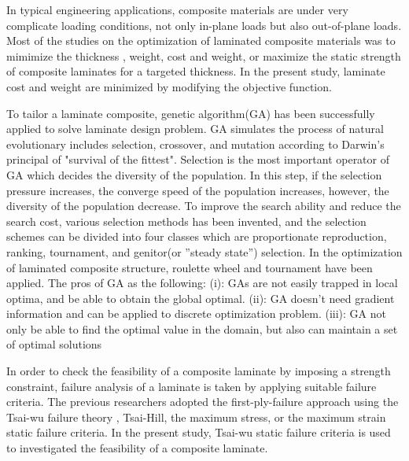 \documentclass[smallextended]{svjour3}       %
\begin{document}
In typical engineering applications, composite materials are under very
complicate loading conditions, not only in-plane loads but also out-of-plane
loads. Most of the studies on the optimization of laminated composite materials
was to mimimize the thickness \cite{abu1998optimum,walker2003technique},
weight\cite{fang1993design,deka2005multiobjective,park2008improved}, cost and
weight\cite{deka2005multiobjective,omkar2008artificial}, or maximize the static
strength of composite laminates for a targeted
thickness\cite{walker2003technique,lin2004stacking,kim2007development}. In the
present study, laminate cost and weight are minimized by modifying the objective function.

To tailor a laminate composite, genetic algorithm(GA) has been successfully
applied to solve laminate design
problem\cite{riche1993optimization,nagendra1996improved,sadagopan1998application,todoroki1998stacking,liu2000permutation,sivakumar1998optimum,walker2003technique,lin2004stacking,kang2005minimum,murugan2007target,akbulut2008optimum}.
GA simulates the process of natural evolutionary includes selection, crossover, 
and mutation according to Darwin's principal of "survival of the fittest".
Selection is the most important operator  of GA which decides the diversity of
the population.  In this step, if the selection pressure increases, the
converge speed of the population increases, however, the diversity of the
population decrease.  To improve the search ability and reduce the search cost,
various selection methods has been invented, and the selection schemes can be
divided into four classes which are proportionate reproduction, ranking,
tournament, and genitor(or ”steady state”) selection. In the optimization of
laminated composite structure, roulette wheel\cite{riche1993optimization,seresta2007optimal} and
tournament\cite{lin2004stacking} have been applied.
The pros of GA as the following: (i): GAs are not easily trapped in local
optima, and be able to obtain the global optimal. (ii): GA doesn't need
gradient information and can be applied to discrete optimization problem.
(iii): GA not only be able to find the optimal value in the domain, but also
can maintain a set of optimal solutions


In order to check the feasibility of a composite laminate by imposing a
strength constraint, failure analysis of a laminate is taken by applying
suitable failure criteria. The previous researchers adopted the
first-ply-failure approach using the Tsai-wu failure theory
\cite{massard1984computer,reddy1987first,fang1993design,soeiro1994multilevel,pelletier2006multi,jadhav2007parametric,omkar2008artificial,choudhury2019failure},
Tsai-Hill\cite{martin1987optimum,soares1995discrete}, the maximum
stress\cite{jadhav2007parametric,omkar2008artificial}, or the maximum
strain\cite{watkins1987multicriteria} static failure criteria. In the present
study, Tsai-wu static failure criteria is used to investigated the feasibility
of a composite laminate.
\end{document}
